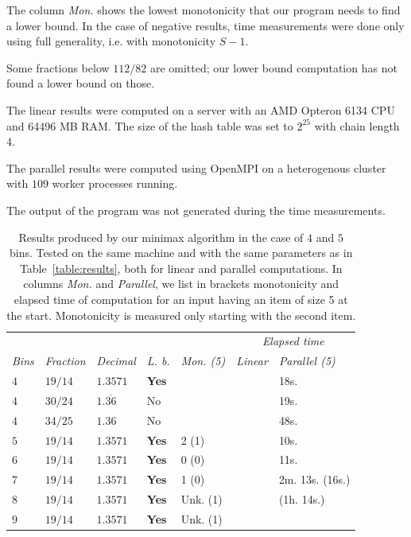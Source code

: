 \begin{table}
{The column \textit{Mon.} shows the lowest monotonicity that our
program needs to find a lower bound. In the case of negative results,
time measurements were done only using full generality, i.e. with
monotonicity $S-1$.

Some fractions below $112/82$ are omitted; our lower bound computation
has not found a lower bound on those.

The linear results were computed on a server with an AMD Opteron 6134
CPU and 64496 MB RAM. The size of the hash table was set to $2^{25}$
with chain length $4$.

The parallel results were computed using OpenMPI on a heterogenous
cluster with $109$ worker processes running.

The output of the program was not generated during the
time measurements.}\label{table:results}

\end{table}

\begin{table}
\begin{center}
\begin{tabular}{lllllll}\label{tab:resultsmulti}
& & & & & \multicolumn{2}{c}{\textit{Elapsed time}}  \\
\textit{Bins} & \textit{Fraction} & \textit{Decimal} & \textit{L. b.} & \textit{Mon. (5)} & \textit{Linear} & \textit{Parallel (5)}\\
\hline
$4$  & $19/14$ &  $1.3571$ & \textbf{Yes} & & & 18s.  \\
$4$  & $30/24$ & $1.\overline{36}$ & No   & & & 19s. \\
$4$  & $34/25$ &  $1.36$   & No           & & & 48s.  \\ 
$5$  & $19/14$ &  $1.3571$ & \textbf{Yes} & 2 (1) & & 10s. \\
$6$  & $19/14$ &  $1.3571$ & \textbf{Yes} & 0 (0) & & 11s. \\
$7$  & $19/14$ &  $1.3571$ & \textbf{Yes} & 1 (0) & & 2m. 13s. (16s.) \\
$8$  & $19/14$ &  $1.3571$ & \textbf{Yes} & Unk. (1) & & (1h. 14s.)  \\
$9$  & $19/14$ &  $1.3571$ & \textbf{Yes} & Unk. (1) & &  \\
\end{tabular}
\end{center}
\caption{Results produced by our minimax algorithm in the case of $4$
and $5$ bins.  Tested on the same machine and with the same parameters
as in Table~\ref{table:results}, both for linear and parallel
computations. In columns \textit{Mon.} and \textit{Parallel}, we list
in brackets monotonicity and elapsed time of computation for an input
having an item of size 5 at the start. Monotonicity is measured only
starting with the second item.}
\end{table}


